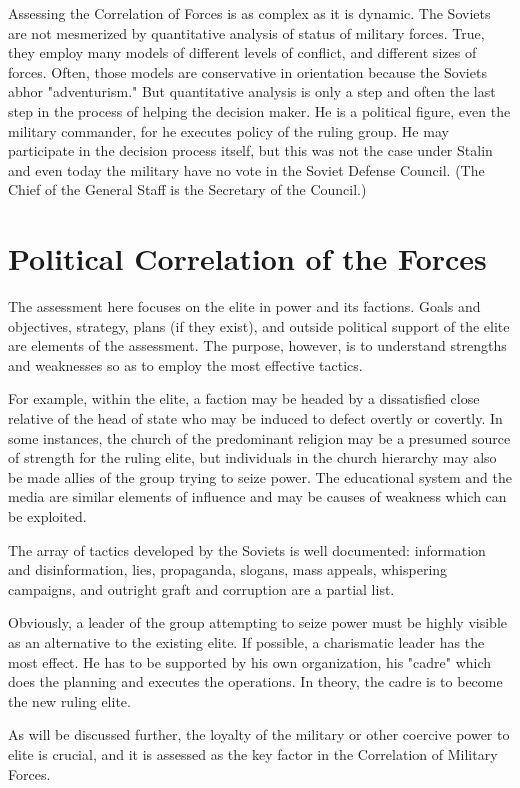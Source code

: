 Assessing the Correlation of Forces is as complex as it is dynamic. The Soviets are not mesmerized by quantitative analysis of status of military forces. True, they employ many models of different levels of conflict, and different sizes of forces. Often, those models are conservative in orientation because the Soviets abhor "adventurism." But quantitative analysis is only a step and often the last step in the process of helping the decision maker. He is a political figure, even the military commander, for he executes policy of the ruling group. He may participate in the decision process itself, but this was not the case under Stalin and even today the military have no vote in the Soviet Defense Council. (The Chief of the General Staff is the Secretary of the Council.)

\section{Political Correlation of the Forces}
The assessment here focuses on the elite in power and its factions. Goals and objectives, strategy, plans (if they exist), and outside political support of the elite are elements of the assessment. The purpose, however, is to understand strengths and weaknesses so as to employ the most effective tactics.

For example, within the elite, a faction may be headed by a dissatisfied close relative of the head of state who may be induced to defect overtly or covertly. In some instances, the church of the predominant religion may be a presumed source of strength for the ruling elite, but individuals in the church hierarchy may also be made allies of the group trying to seize power. The educational system and the media are similar elements of influence and may be causes of weakness which can be exploited.

The array of tactics developed by the Soviets is well documented: information and disinformation, lies, propaganda, slogans, mass appeals, whispering campaigns, and outright graft and corruption are a partial list.

Obviously, a leader of the group attempting to seize power must be highly visible as an alternative to the existing elite. If possible, a charismatic leader has the most effect. He has to be supported by his own organization, his "cadre" which does the planning and executes the operations. In theory, the cadre is to become the new ruling elite.

As will be discussed further, the loyalty of the military or other coercive power to elite is crucial, and it is assessed as the key factor in the Correlation of Military Forces.

